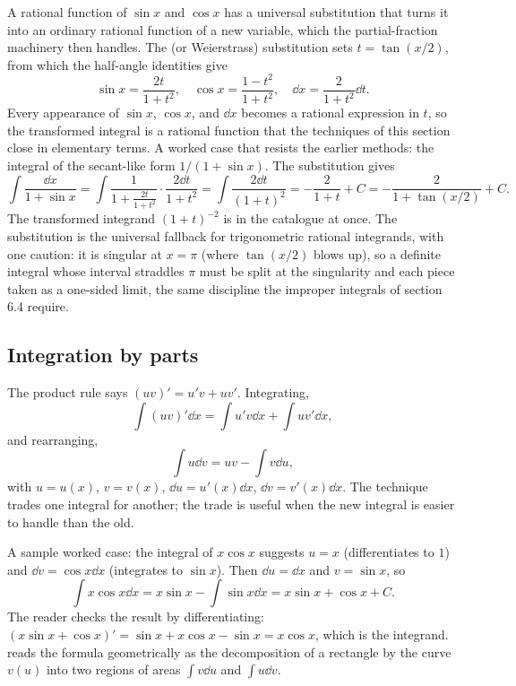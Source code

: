A rational function of $\sin x$ and $\cos x$ has a universal
substitution that turns it into an ordinary rational function of a
new variable, which the partial-fraction machinery then handles. The
 (or Weierstrass) substitution sets $t =
\tan(x/2)$, from which the half-angle identities give
\[
\sin x = \frac{2t}{1 + t^{2}}, \quad
\cos x = \frac{1 - t^{2}}{1 + t^{2}}, \quad
\dd x = \frac{2}{1 + t^{2}}\dd t.
\]
Every appearance of $\sin x$, $\cos x$, and $\dd x$ becomes a rational
expression in $t$, so the transformed integral is a rational function
that the techniques of this section close in elementary terms. A
worked case that resists the earlier methods: the integral of the
secant-like form $1/(1 + \sin x)$. The substitution gives
\[
\int\frac{\dd x}{1 + \sin x} =
\int\frac{1}{1 + \frac{2t}{1 + t^{2}}}\cdot\frac{2\dd t}{1 + t^{2}}
= \int\frac{2\dd t}{(1 + t)^{2}}
= -\frac{2}{1 + t} + C = -\frac{2}{1 + \tan(x/2)} + C.
\]
The transformed integrand $(1 + t)^{-2}$ is in the catalogue at once.
The substitution is the universal fallback for trigonometric rational
integrands, with one caution: it is singular at $x = \pi$ (where
$\tan(x/2)$ blows up), so a definite integral whose interval straddles
$\pi$ must be split at the singularity and each piece taken as a
one-sided limit, the same discipline the improper integrals of
section 6.4 require.

\subsection{Integration by parts}

The product rule says $(uv)' = u'v + uv'$. Integrating,
\[
\int (uv)' \dd x = \int u'v \dd x + \int uv' \dd x,
\]
and rearranging,
\[
\int u \dd v = uv - \int v \dd u,
\]
with $u = u(x)$, $v = v(x)$, $\dd u = u'(x) \dd x$, $\dd v = v'(x)
\dd x$. The technique trades one integral for another; the trade
is useful when the new integral is easier to handle than the old.

A sample worked case: the integral of $x \cos x$ suggests $u = x$
(differentiates to $1$) and $\dd v = \cos x \dd x$ (integrates to
$\sin x$). Then $\dd u = \dd x$ and $v = \sin x$, so
\[
\int x \cos x \dd x = x \sin x - \int \sin x \dd x =
x \sin x + \cos x + C.
\]
The reader checks the result by differentiating: $(x \sin x +
\cos x)' = \sin x + x \cos x - \sin x = x \cos x$, which is the
integrand.  reads the
formula geometrically as the decomposition of a rectangle by the
curve $v(u)$ into two regions of areas $\int v \dd u$ and $\int u
\dd v$.

